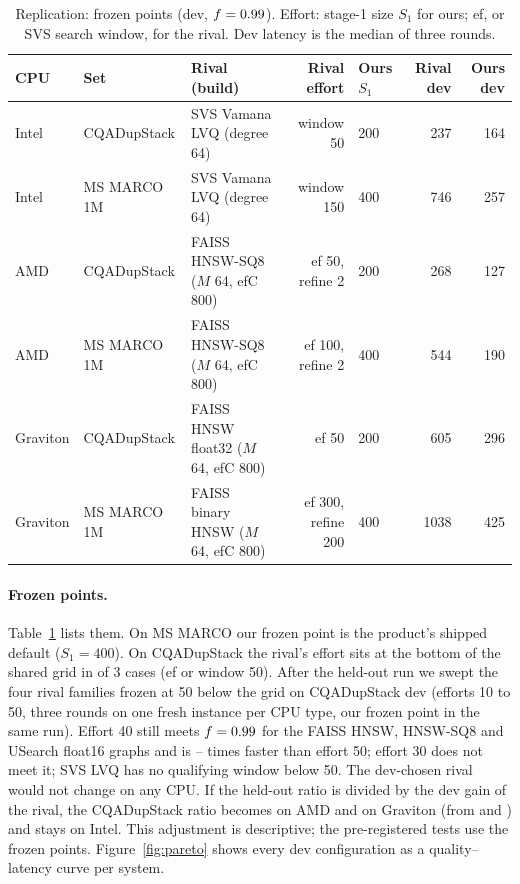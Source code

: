 \begin{table}[t]\centering\scriptsize
\caption{Replication: frozen points (dev, $f = 0.99$). Effort: stage-1 size $S_1$ for ours; ef, or SVS search window,
for the rival. Dev latency is the median of three rounds.}\label{tab:rep-points}
\setlength{\tabcolsep}{3pt}
\begin{tabular}{lllrlrr}\toprule
CPU & Set & Rival (build) & Rival effort & Ours $S_1$ & Rival dev \us{} & Ours dev \us{}\\\midrule
Intel & CQADupStack & SVS Vamana LVQ (degree 64) & window 50 & 200 & 237 & 164\\
Intel & MS MARCO 1M & SVS Vamana LVQ (degree 64) & window 150 & 400 & 746 & 257\\
AMD & CQADupStack & FAISS HNSW-SQ8 ($M$ 64, efC 800) & ef 50, refine 2 & 200 & 268 & 127\\
AMD & MS MARCO 1M & FAISS HNSW-SQ8 ($M$ 64, efC 800) & ef 100, refine 2 & 400 & 544 & 190\\
Graviton & CQADupStack & FAISS HNSW float32 ($M$ 64, efC 800) & ef 50 & 200 & 605 & 296\\
Graviton & MS MARCO 1M & FAISS binary HNSW ($M$ 64, efC 800) & ef 300, refine 200 & 400 & 1038 & 425\\\bottomrule
\end{tabular}
\end{table}

\paragraph{Frozen points.} Table~\ref{tab:rep-points} lists them. On MS MARCO our frozen point is the product's
shipped default ($S_1 = 400$). On CQADupStack the rival's effort sits at the bottom of the shared grid in
 of 3 cases (ef or window 50). After the held-out run we swept the four rival families frozen at 50 below
the grid on CQADupStack dev (efforts 10 to 50, three rounds on one fresh instance per CPU type, our frozen point in the
same run). Effort 40 still meets $f = 0.99$ for the FAISS HNSW, HNSW-SQ8 and USearch float16 graphs and is
-- times faster than effort 50; effort 30 does not meet it; SVS LVQ has no qualifying
window below 50. The dev-chosen rival would not change on any CPU. If the held-out ratio is divided by the dev gain of
the rival, the CQADupStack ratio becomes  on AMD and  on Graviton (from
 and ) and stays  on Intel. This adjustment is descriptive; the pre-registered tests
use the frozen points. Figure~\ref{fig:pareto} shows every dev configuration as a quality--latency curve per system.

